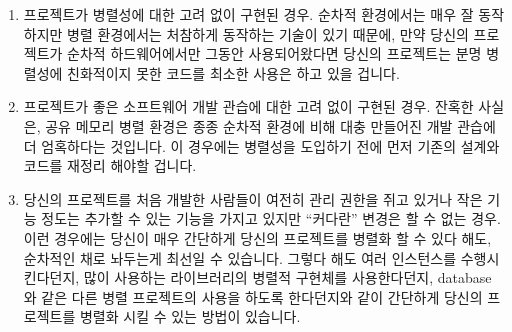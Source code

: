 \begin{enumerate}

	\item	프로젝트가 병렬성에 대한 고려 없이 구현된 경우.
		순차적 환경에서는 매우 잘 동작하지만 병렬 환경에서는 처참하게
		동작하는 기술이 있기 때문에, 만약 당신의 프로젝트가 순차적
		하드웨어에서만 그동안 사용되어왔다면 당신의 프로젝트는 분명
		병렬성에 친화적이지 못한 코드를 최소한 사용은 하고 있을 겁니다.

	\item	프로젝트가 좋은 소프트웨어 개발 관습에 대한 고려 없이 구현된
		경우.
		잔혹한 사실은, 공유 메모리 병렬 환경은 종종 순차적 환경에 비해
		대충 만들어진 개발 관습에 더 엄혹하다는 것입니다.
		이 경우에는 병렬성을 도입하기 전에 먼저 기존의 설계와 코드를
		재정리 해야할 겁니다.

	\item	당신의 프로젝트를 처음 개발한 사람들이 여전히 관리 권한을 쥐고
		있거나 작은 기능 정도는 추가할 수 있는 기능을 가지고 있지만
		``커다란'' 변경은 할 수 없는 경우.
		이런 경우에는 당신이 매우 간단하게 당신의 프로젝트를 병렬화 할
		수 있다 해도, 순차적인 채로 놔두는게 최선일 수 있습니다.
		그렇다 해도 여러 인스턴스를 수행시킨다던지, 많이 사용하는
		라이브러리의 병렬적 구현체를 사용한다던지, database 와 같은
		다른 병렬 프로젝트의 사용을 하도록 한다던지와 같이 간단하게
		당신의 프로젝트를 병렬화 시킬 수 있는 방법이 있습니다.


\end{enumerate}
